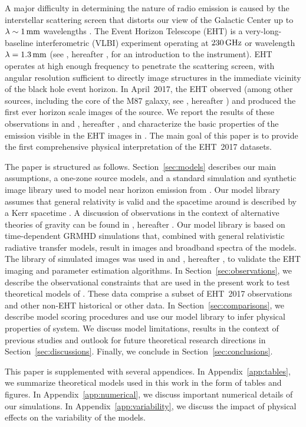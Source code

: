 A major difficulty in determining the nature of \sgra radio emission is caused by the interstellar scattering screen that distorts our view of the Galactic Center up to $\lambda \sim 1\,\mathrm{mm}$ wavelengths
\citep[see][and references therein]{2018arXiv180501242P, 2018ApJ...865..104J,2019ApJ...871...30I}.
The Event Horizon Telescope (EHT) is a very-long-baseline interferometric (VLBI) experiment operating at $230\,\mathrm{GHz}$ or wavelength $\lambda = 1.3\,\mathrm{mm}$
(see \citealt{M87PaperII}, hereafter , for an introduction to the instrument).  EHT operates at high enough frequency to penetrate the scattering screen, with angular resolution sufficient to directly image structures in the immediate vicinity of the black hole event horizon.
In April~2017, the EHT observed \sgra (among other sources, including the core of the M87 galaxy, see \citealt{M87PaperI}, hereafter ) and produced the first ever horizon scale images of the source.
We report the results of these observations in  and \citet{PaperIII}, hereafter , and characterize the basic properties of the emission visible in the EHT images in .
The main goal of this paper  is to provide the first comprehensive physical interpretation of the EHT~2017 \sgra datasets.

The paper is structured as follows. Section~\ref{sec:models} describes our main assumptions, a one-zone source models, and a standard simulation and synthetic image library used to model near horizon emission from \sgra. Our model library assumes that general relativity is valid and the spacetime around \sgra is described by a Kerr spacetime \citep{1963PhRvL..11..237K}.
A discussion of \sgra observations in the context of alternative theories of gravity can be found in  \citet{PaperVI}, hereafter .
Our model library is based on time-dependent GRMHD simulations that, combined with general relativistic radiative transfer models, result in images and broadband spectra of the models.
The library of simulated images was used in  and \citet{PaperIV}, hereafter , to validate the \sgra EHT imaging and parameter estimation algorithms.
In Section~\ref{sec:observations}, we describe the  observational constraints that are used in the present work to test theoretical models of \sgra.
These data comprise a subset of EHT~2017 observations and other non-EHT historical or other data.
In Section~\ref{sec:comparisons}, we describe model scoring procedures and use our model library to infer physical properties of \sgra system.
We discuss model limitations, results in the context of previous studies and outlook for future \sgra theoretical research directions in Section~\ref{sec:discussions}.
Finally, we conclude in Section~\ref{sec:conclusions}.

This paper is supplemented with several appendices.
In Appendix~\ref{app:tables},      we summarize theoretical models used in this work in the form of tables and figures.
In Appendix~\ref{app:numerical},   we discuss important numerical details of our simulations.
In Appendix~\ref{app:variability}, we discuss the impact of physical effects on the variability of the models.
